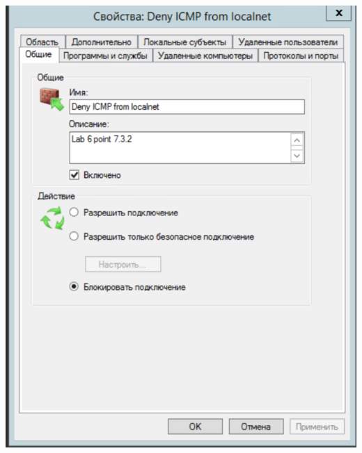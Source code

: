 \documentclass[a4paper,14pt]{extarticle}
\begin{document}
    \begin{center}
        \includegraphics[scale=0.7]{7.6.1.png}
    \end{center}
\end{document}
